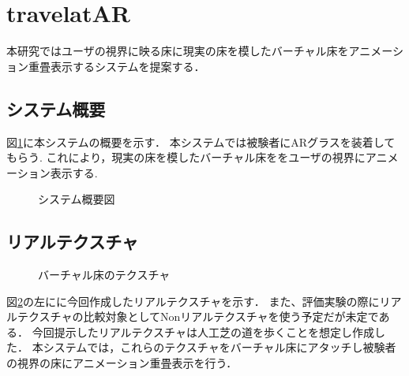 \documentclass[dvipdfmx]{jsarticle}
\begin{document}
\section{travelatAR}
本研究ではユーザの視界に映る床に現実の床を模したバーチャル床をアニメーション重畳表示するシステムを提案する．


\subsection{システム概要}
図\ref{fig:gaiyo}に本システムの概要を示す．
本システムでは被験者にARグラスを装着してもらう.
これにより，現実の床を模したバーチャル床ををユーザの視界にアニメーション表示する.
\begin{figure}[t]
    \centering
    \caption{システム概要図}
    \label{fig:gaiyo}
\end{figure}

\subsection{リアルテクスチャ}
\begin{figure}[htbp]
    \centering
    \caption{バーチャル床のテクスチャ}
    \label{fig:texture}
\end{figure}
図\ref{fig:texture}の左にに今回作成したリアルテクスチャを示す．
また、評価実験の際にリアルテクスチャの比較対象としてNonリアルテクスチャを使う予定だが未定である．
今回提示したリアルテクスチャは人工芝の道を歩くことを想定し作成した．
本システムでは，これらのテクスチャをバーチャル床にアタッチし被験者の視界の床にアニメーション重畳表示を行う．
\end{document}
